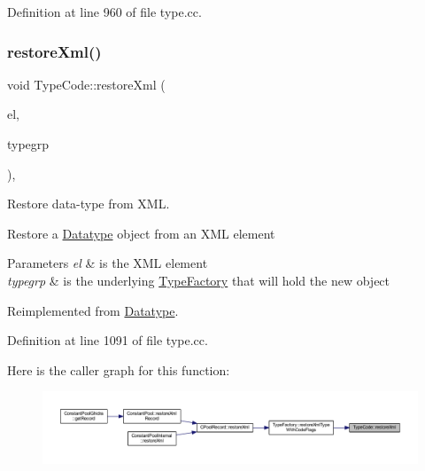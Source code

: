 Definition at line 960 of file type.\+cc.

\mbox{\label{class_type_code_a8b721a26b30c296fe2510738601e3333}} 
\subsubsection{\texorpdfstring{restoreXml()}{restoreXml()}}
{\footnotesize\ttfamily void Type\+Code\+::restore\+Xml (\begin{DoxyParamCaption}\item[{const \mbox{\hyperlink{class_element}{Element}} $\ast$}]{el,  }\item[{\mbox{\hyperlink{class_type_factory}{Type\+Factory}} \&}]{typegrp }\end{DoxyParamCaption})\hspace{0.3cm}{\ttfamily [protected]}, {\ttfamily [virtual]}}



Restore data-\/type from X\+ML. 

Restore a \mbox{\hyperlink{class_datatype}{Datatype}} object from an X\+ML element 
\begin{DoxyParams}{Parameters}
{\em el} & is the X\+ML element \\
\hline
{\em typegrp} & is the underlying \mbox{\hyperlink{class_type_factory}{Type\+Factory}} that will hold the new object \\
\hline
\end{DoxyParams}


Reimplemented from \mbox{\hyperlink{class_datatype_aed882ae693a31a64d56fffb9abdaa575}{Datatype}}.



Definition at line 1091 of file type.\+cc.

Here is the caller graph for this function\+:
\nopagebreak
\begin{figure}[H]
\begin{center}
\leavevmode
\includegraphics[width=350pt]{class_type_code_a8b721a26b30c296fe2510738601e3333_icgraph}
\end{center}
\end{figure}
\mbox{\label{class_type_code_a6d47db2c7cf2a968b49cbac59de182d7}} 
